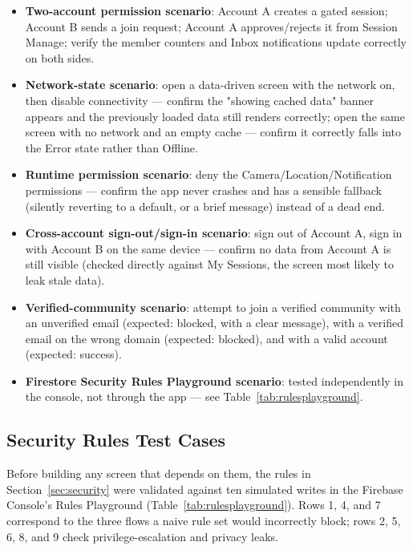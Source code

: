 \begin{itemize}
    \item \textbf{Two-account permission scenario}: Account A creates a gated session; Account B sends a join request; Account A approves/rejects it from Session Manage; verify the member counters and Inbox notifications update correctly on both sides.
    \item \textbf{Network-state scenario}: open a data-driven screen with the network on, then disable connectivity — confirm the "showing cached data" banner appears and the previously loaded data still renders correctly; open the same screen with no network and an empty cache — confirm it correctly falls into the Error state rather than Offline.
    \item \textbf{Runtime permission scenario}: deny the Camera/Location/Notification permissions — confirm the app never crashes and has a sensible fallback (silently reverting to a default, or a brief message) instead of a dead end.
    \item \textbf{Cross-account sign-out/sign-in scenario}: sign out of Account A, sign in with Account B on the same device — confirm no data from Account A is still visible (checked directly against My Sessions, the screen most likely to leak stale data).
    \item \textbf{Verified-community scenario}: attempt to join a verified community with an unverified email (expected: blocked, with a clear message), with a verified email on the wrong domain (expected: blocked), and with a valid account (expected: success).
    \item \textbf{Firestore Security Rules Playground scenario}: tested independently in the console, not through the app — see Table~\ref{tab:rulesplayground}.
\end{itemize}

\subsection{Security Rules Test Cases}
\label{sec:rulesplayground}

Before building any screen that depends on them, the rules in Section~\ref{sec:security} were validated against ten simulated writes in the Firebase Console's Rules Playground (Table~\ref{tab:rulesplayground}). Rows 1, 4, and 7 correspond to the three flows a naive rule set would incorrectly block; rows 2, 5, 6, 8, and 9 check privilege-escalation and privacy leaks.

